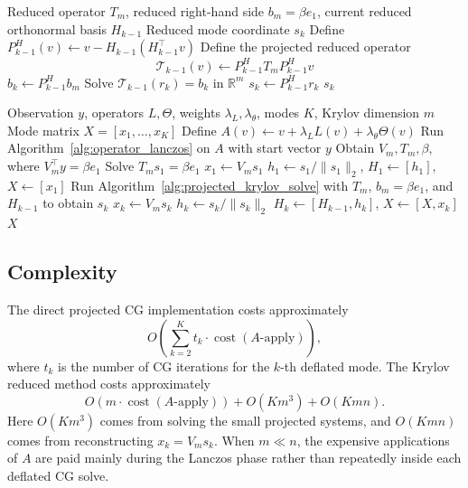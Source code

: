 \begin{algorithm}[H]
\caption{Projected Krylov subspace solve for one deflated mode}
\label{alg:projected_krylov_solve}
\begin{algorithmic}[1]
\Require Reduced operator \(T_m\), reduced right-hand side \(b_m=\beta e_1\),
current reduced orthonormal basis \(H_{k-1}\)
\Ensure Reduced mode coordinate \(s_k\)
\State Define \(P^H_{k-1}(v)\gets v-H_{k-1}(H_{k-1}^{\top}v)\)
\State Define the projected reduced operator
\[
\mathcal T_{k-1}(v)\gets P^H_{k-1}T_mP^H_{k-1}v
\]
\State \(b_k\gets P^H_{k-1}b_m\)
\State Solve \(\mathcal T_{k-1}(r_k)=b_k\) in \(\mathbb R^m\)
\State \(s_k\gets P^H_{k-1}r_k\)
\State \Return \(s_k\)
\end{algorithmic}
\end{algorithm}

\begin{algorithm}[H]
\caption{Krylov reduced multi-mode signal generation}
\label{alg:krylov_reduced_multimode}
\begin{algorithmic}[1]
\Require Observation \(y\), operators \(L,\Theta\), weights
\(\lambda_L,\lambda_\theta\), modes \(K\), Krylov dimension \(m\)
\Ensure Mode matrix \(X=[x_1,\ldots,x_K]\)
\State Define \(A(v)\gets v+\lambda_L L(v)+\lambda_\theta\Theta(v)\)
\State Run Algorithm~\ref{alg:operator_lanczos} on \(A\) with start vector \(y\)
\State Obtain \(V_m,T_m,\beta\), where \(V_m^{\top}y=\beta e_1\)
\State Solve \(T_m s_1=\beta e_1\)
\State \(x_1\gets V_m s_1\)
\State \(h_1\gets s_1/\|s_1\|_2\), \quad \(H_1\gets[h_1]\), \quad \(X\gets[x_1]\)
    \State Run Algorithm~\ref{alg:projected_krylov_solve} with
    \(T_m\), \(b_m=\beta e_1\), and \(H_{k-1}\) to obtain \(s_k\)
    \State \(x_k\gets V_m s_k\)
    \State \(h_k\gets s_k/\|s_k\|_2\)
    \State \(H_k\gets[H_{k-1},h_k]\), \quad \(X\gets[X,x_k]\)
\EndFor
\State \Return \(X\)
\end{algorithmic}
\end{algorithm}

\subsection{Complexity}

The direct projected CG implementation costs approximately
\[
O\left(\sum_{k=2}^{K}t_k\cdot \operatorname{cost}(A\text{-apply})\right),
\]
where \(t_k\) is the number of CG iterations for the \(k\)-th deflated mode.
The Krylov reduced method costs approximately
\[
O\left(m\cdot\operatorname{cost}(A\text{-apply})\right)
+O(Km^3)+O(Kmn).
\]
Here \(O(Km^3)\) comes from solving the small projected systems, and
\(O(Kmn)\) comes from reconstructing \(x_k=V_m s_k\).
When \(m\ll n\), the expensive applications of \(A\) are paid mainly during
the Lanczos phase rather than repeatedly inside each deflated CG solve.

